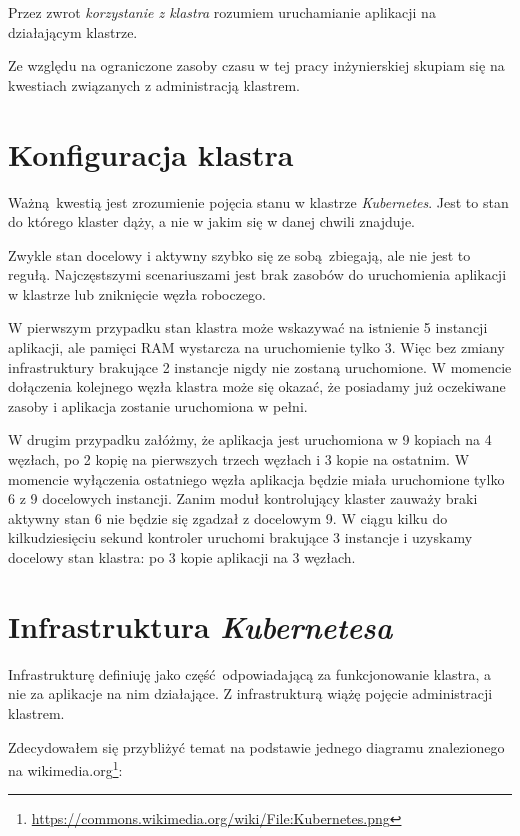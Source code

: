\documentclass[a4paper,12pt,twoside,openany]{report}
\DeclareRobustCommand{\href}[2]{#2\footnote{\url{#1}}}
\begin{document}
Przez zwrot \emph{korzystanie z klastra} rozumiem uruchamianie aplikacji
na działającym klastrze.

Ze względu na ograniczone zasoby czasu w tej pracy inżynierskiej skupiam
się na kwestiach związanych z administracją klastrem.

\hypertarget{konfiguracja-klastra}{%
\section{Konfiguracja klastra}\label{konfiguracja-klastra}}

Ważną~kwestią jest zrozumienie pojęcia stanu w klastrze
\emph{Kubernetes}. Jest to stan do którego klaster dąży, a nie w jakim
się w danej chwili znajduje.

Zwykle stan docelowy i aktywny szybko się ze sobą~zbiegają, ale nie jest
to regułą. Najczęstszymi scenariuszami jest brak zasobów do uruchomienia
aplikacji w klastrze lub zniknięcie węzła roboczego.

W pierwszym przypadku stan klastra może wskazywać na istnienie 5
instancji aplikacji, ale pamięci RAM wystarcza na uruchomienie tylko 3.
Więc bez zmiany infrastruktury brakujące 2 instancje nigdy nie zostaną
uruchomione. W momencie dołączenia kolejnego węzła klastra może się
okazać, że posiadamy już oczekiwane zasoby i aplikacja zostanie
uruchomiona w pełni.

W drugim przypadku załóżmy, że aplikacja jest uruchomiona w 9 kopiach na
4 węzłach, po 2 kopię na pierwszych trzech węzłach i 3 kopie na
ostatnim. W momencie wyłączenia ostatniego węzła aplikacja będzie miała
uruchomione tylko 6 z 9 docelowych instancji. Zanim moduł kontrolujący
klaster zauważy braki aktywny stan 6 nie będzie się zgadzał z docelowym
9. W ciągu kilku do kilkudziesięciu sekund kontroler uruchomi brakujące
3 instancje i uzyskamy docelowy stan klastra: po 3 kopie aplikacji na 3
węzłach.

\hypertarget{infrastruktura-kubernetesa}{%
\section{\texorpdfstring{Infrastruktura
\emph{Kubernetesa}}{Infrastruktura Kubernetesa}}\label{infrastruktura-kubernetesa}}

Infrastrukturę definiuję jako część~odpowiadającą za funkcjonowanie
klastra, a nie za aplikacje na nim działające. Z infrastrukturą wiążę
pojęcie administracji klastrem.

Zdecydowałem się przybliżyć temat na podstawie
\href{https://commons.wikimedia.org/wiki/File:Kubernetes.png}{jednego
diagramu znalezionego na wikimedia.org}:
\end{document}

